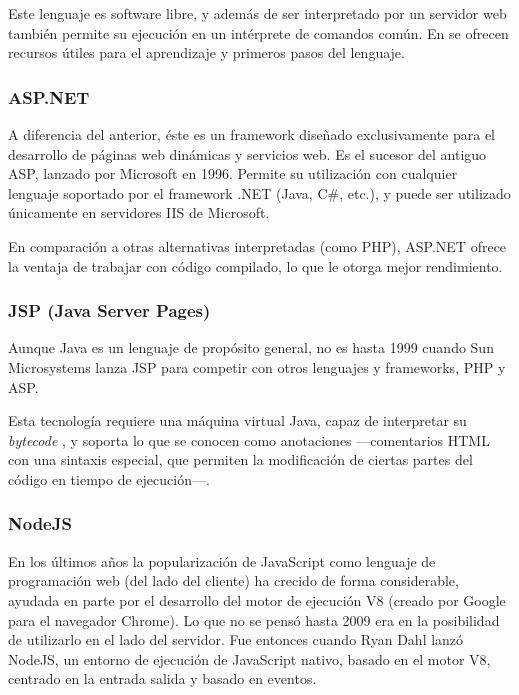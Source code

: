 Este lenguaje es software libre, y además de ser interpretado por un servidor web también permite su ejecución en un intérprete de comandos común. En \cite{php} se ofrecen recursos útiles para el aprendizaje y primeros pasos del lenguaje.

\subsubsection{ASP.NET}

A diferencia del anterior, éste es un framework diseñado exclusivamente para el desarrollo de páginas web dinámicas y servicios web. Es el sucesor del antiguo \acs{ASP}, lanzado por Microsoft en 1996. Permite su utilización con cualquier lenguaje soportado por el framework .NET (Java, C\#, etc.), y puede ser utilizado únicamente en servidores \acs{IIS} de Microsoft.

En comparación a otras alternativas interpretadas (como PHP), ASP.NET ofrece la ventaja de trabajar con código compilado, lo que le otorga mejor rendimiento.

\subsubsection{JSP (Java Server Pages)}

Aunque Java es un lenguaje de propósito general, no es hasta 1999 cuando Sun Microsystems lanza \acs{JSP} para competir con otros lenguajes y frameworks, PHP y \acs{ASP}.

Esta tecnología requiere una máquina virtual Java, capaz de interpretar su {\it bytecode} , y soporta lo que se conocen como anotaciones ---comentarios \acs{HTML} con una sintaxis especial, que permiten la modificación de ciertas partes del código en tiempo de ejecución---.

\subsubsection{NodeJS}

En los últimos años la popularización de JavaScript como lenguaje de programación web (del lado del cliente) ha crecido de forma considerable, ayudada en parte por el desarrollo del motor de ejecución V8 (creado por Google para el navegador Chrome). Lo que no se pensó hasta 2009 era en la posibilidad de utilizarlo en el lado del servidor. Fue entonces cuando Ryan Dahl lanzó NodeJS, un entorno de ejecución de JavaScript nativo, basado en el motor V8, centrado en la entrada salida y basado en eventos.

